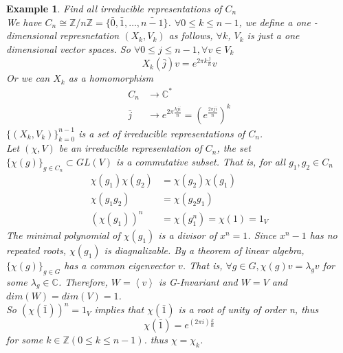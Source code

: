 \documentclass[letterpaper, leqno, 12pt]{article}
\newcommand{\fin}{\qquad \quad \hfill \framebox[1.75mm][l]{\,}}
\newcommand{\bZ}{\mathbb{Z}}
\providecommand{\ip}[1]{\left\langle #1 \right\rangle}
\newcommand{\bC} {\mathbb{C}}
\theoremstyle{stdthm}
\theoremstyle{stddef}
\newtheorem{eg}[thm]{Example} %
\theoremstyle{stdnonum}
\theoremstyle{stdqands}
\theoremstyle{stdbold}
\begin{document}
\begin{eg}{Find all irreducible representations of $C_n$}
\\
We have $C_n \cong \bZ/n\bZ = \{ \bar{0},\bar{1},\dots, \bar{n-1}\}$. $\forall 0\leq k \leq n-1$, we define a one -dimensional represnetation $(X_k, V_k)$ as follows, $\forall k$, $V_k$ is just a one dimensional vector spaces. So $\forall 0\leq j\leq n-1, \forall v \in V_k$
\[X_k (\bar{j}) v  = e^{2\pi k \frac{j}{n}}v \]
Or we can $X_k$ as a homomorphism
\begin{align*}
C_n & \rightarrow \bC^*\\
\bar{j}& \rightarrow e^{2\pi \frac{kji}{n}} = \left(e^{\frac{2\pi j i}{n}} \right)^k
\end{align*}
$\{(X_k,V_k)\}_{k=0}^{n-1}$ is a set of irreducible representations of $C_n$. \\

Let $(\chi,V)$ be an irreducible representation of $C_n$, the set $\{ \chi(g)\}_{g\in C_n} \subset GL(V)$ is a commutative subset. That is, for all $g_1,g_2 \in C_n$
\begin{align*}
\chi(g_1)\chi(g_2) &= \chi(g_2) \chi(g_1)\\
\chi(g_1g_2)&= \chi(g_2g_1)\\
(\chi(g_1))^n &= \chi(g_1^n) =\chi(1) = 1_V
\end{align*}
The minimal polynomial of $\chi(g_1)$ is a divisor of $x^n = 1$. Since  $x^n - 1$ has no repeated roots, $\chi(g_1)$ is diagnalizable. By a theorem of linear algebra, $\{\chi(g)\}_ {g\in G}$ has a common eigenvector $v$. That is,  $\forall g\in G, \chi(g) v = \lambda_g v$ for some $\lambda_g \in \bC$. Therefore, $W = \ip{v}$ is G-Invariant and $W = V$ and $dim(W) = dim(V) = 1$.\\

So $(\chi(\bar{1}))^n = 1_V$ implies that $\chi(\bar{1})$ is a root of unity of order n, thus 
\[\chi(\bar{1}) = e^{(2\pi i) \frac{k}{n}} \]
for some $k\in \bZ (0 \leq k \leq n-1)$. thus $\chi = \chi_k$. 
\end{eg}
\end{document}
